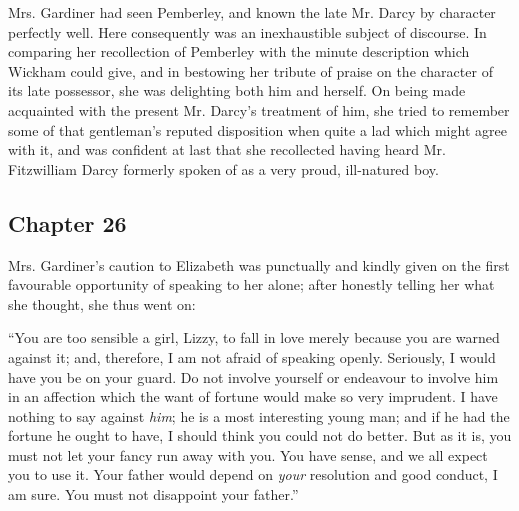 Mrs. Gardiner had seen Pemberley, and known the late Mr. Darcy by character perfectly well. Here consequently was an inexhaustible subject of discourse. In comparing her recollection of Pemberley with the minute description which Wickham could give, and in bestowing her tribute of praise on the character of its late possessor, she was delighting both him and herself. On being made acquainted with the present Mr. Darcy's treatment of him, she tried to remember some of that gentleman's reputed disposition when quite a lad which might agree with it, and was confident at last that she recollected having heard Mr. Fitzwilliam Darcy formerly spoken of as a very proud, ill-natured boy.

\subsection[chapter-26]{\useURL[url26][][][]\from[url26] Chapter 26}

Mrs. Gardiner's caution to Elizabeth was punctually and kindly given on the first favourable opportunity of speaking to her alone; after honestly telling her what she thought, she thus went on:

“You are too sensible a girl, Lizzy, to fall in love merely because you are warned against it; and, therefore, I am not afraid of speaking openly. Seriously, I would have you be on your guard. Do not involve yourself or endeavour to involve him in an affection which the want of fortune would make so very imprudent. I have nothing to say against {\em him}; he is a most interesting young man; and if he had the fortune he ought to have, I should think you could not do better. But as it is, you must not let your fancy run away with you. You have sense, and we all expect you to use it. Your father would depend on {\em your} resolution and good conduct, I am sure. You must not disappoint your father.”





